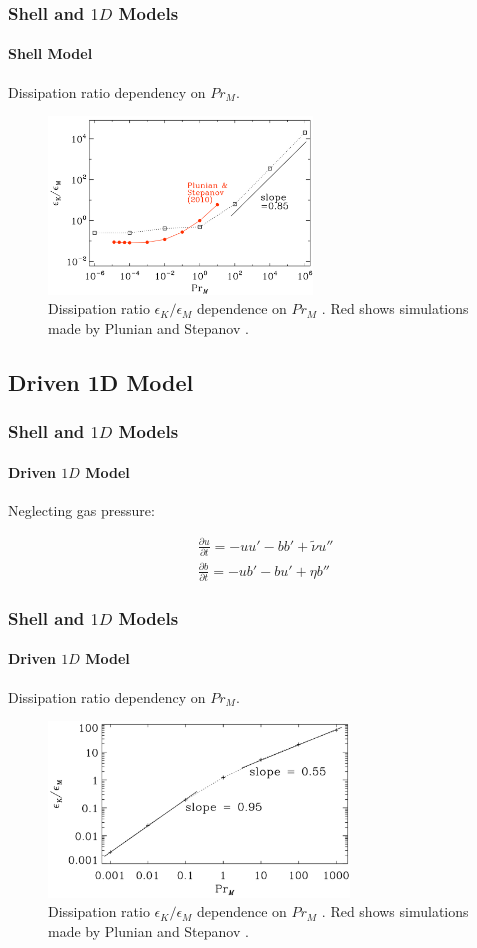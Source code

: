 \documentclass{beamer}
\begin{document}
\begin{frame}
 \frametitle{Shell and $1D$ Models}
 \framesubtitle{Shell Model}
 
 Dissipation ratio dependency on $Pr_M$.
 
 \begin{figure}[t]
  \includegraphics[width=7cm]{img/dissipation_ratio2}
  \caption{Dissipation ratio $\epsilon_K/\epsilon_M$ dependence on $Pr_M$ \cite{brandenburg2014magnetic}. Red shows simulations made by Plunian and Stepanov \cite{plunian2010cascades}.}
  \centering
 \end{figure}
 
\end{frame}

\subsection{Driven 1D Model}

\begin{frame}
 \frametitle{Shell and $1D$ Models}
 \framesubtitle{Driven $1D$ Model}
 
 Neglecting gas pressure:
 
 \begin{align}
  &\frac{\partial u}{\partial t} = -u u' - b b' + \tilde{\nu} u''  \nonumber \\
  &\frac{\partial b}{\partial t} = - u b' - b u' + \eta b'' \nonumber
 \end{align}

 
\end{frame}

\begin{frame}
 \frametitle{Shell and $1D$ Models}
 \framesubtitle{Driven $1D$ Model}
 
 Dissipation ratio dependency on $Pr_M$.
 
 \begin{figure}[t]
  \includegraphics[width=8cm]{img/dissipation_ratio3}
  \caption{Dissipation ratio $\epsilon_K/\epsilon_M$ dependence on $Pr_M$ \cite{brandenburg2014magnetic}. Red shows simulations made by Plunian and Stepanov \cite{plunian2010cascades}.}
  \centering
 \end{figure}
 
\end{frame}
\end{document}
